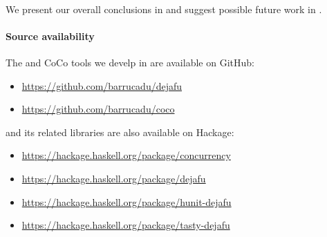 \paragraph{}
We present our overall conclusions in  and
suggest possible future work in .

\paragraph{Source availability}
The \dejafu{} and CoCo tools we develp in  are
available on GitHub:

\begin{itemize}
\item \url{https://github.com/barrucadu/dejafu}
\item \url{https://github.com/barrucadu/coco}
\end{itemize}

\noindent
\dejafu{} and its related libraries are also available on Hackage:

\begin{itemize}
\item \url{https://hackage.haskell.org/package/concurrency}
\item \url{https://hackage.haskell.org/package/dejafu}
\item \url{https://hackage.haskell.org/package/hunit-dejafu}
\item \url{https://hackage.haskell.org/package/tasty-dejafu}
\end{itemize}
